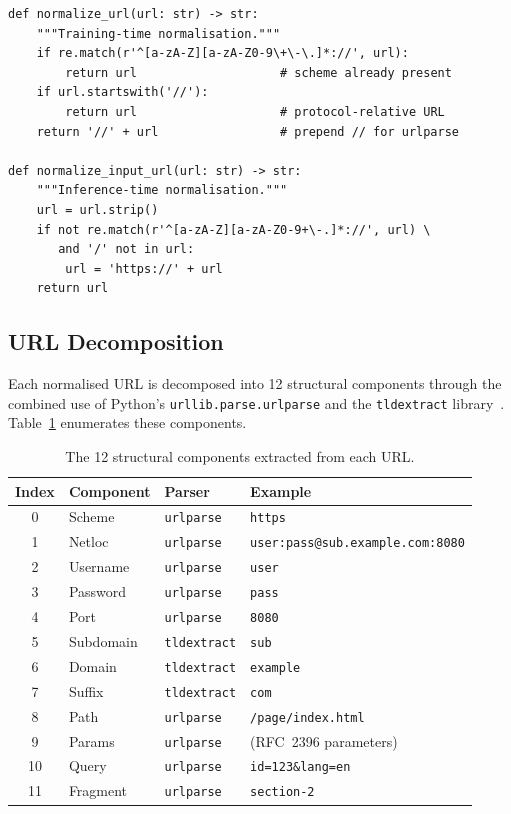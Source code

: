 \documentclass[a4paper,12pt]{article}
\begin{document}
\begin{lstlisting}[caption={URL normalisation functions}]
def normalize_url(url: str) -> str:
    """Training-time normalisation."""
    if re.match(r'^[a-zA-Z][a-zA-Z0-9\+\-\.]*://', url):
        return url                    # scheme already present
    if url.startswith('//'):
        return url                    # protocol-relative URL
    return '//' + url                 # prepend // for urlparse

def normalize_input_url(url: str) -> str:
    """Inference-time normalisation."""
    url = url.strip()
    if not re.match(r'^[a-zA-Z][a-zA-Z0-9+\-.]*://', url) \
       and '/' not in url:
        url = 'https://' + url
    return url
\end{lstlisting}

\subsection{URL Decomposition}

Each normalised URL is decomposed into 12 structural components through the combined use of Python's \texttt{urllib.parse.urlparse} and the \texttt{tldextract} library~\cite{tldextract}. Table~\ref{tab:url_components} enumerates these components.

\begin{table}[H]
\centering
\caption{The 12 structural components extracted from each URL.}
\label{tab:url_components}
\begin{tabular}{clll}
\toprule
\textbf{Index} & \textbf{Component} & \textbf{Parser} & \textbf{Example} \\
\midrule
0  & Scheme     & \texttt{urlparse}   & \texttt{https} \\
1  & Netloc     & \texttt{urlparse}   & \texttt{user:pass@sub.example.com:8080} \\
2  & Username   & \texttt{urlparse}   & \texttt{user} \\
3  & Password   & \texttt{urlparse}   & \texttt{pass} \\
4  & Port       & \texttt{urlparse}   & \texttt{8080} \\
5  & Subdomain  & \texttt{tldextract} & \texttt{sub} \\
6  & Domain     & \texttt{tldextract} & \texttt{example} \\
7  & Suffix     & \texttt{tldextract} & \texttt{com} \\
8  & Path       & \texttt{urlparse}   & \texttt{/page/index.html} \\
9  & Params     & \texttt{urlparse}   & (RFC~2396 parameters) \\
10 & Query      & \texttt{urlparse}   & \texttt{id=123\&lang=en} \\
11 & Fragment   & \texttt{urlparse}   & \texttt{section-2} \\
\bottomrule
\end{tabular}
\end{table}
\end{document}
